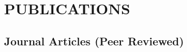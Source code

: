 \documentclass{cv}
\begin{document}


\section*{PUBLICATIONS}

\subsection*{Journal Articles (Peer Reviewed)}
\end{document}
